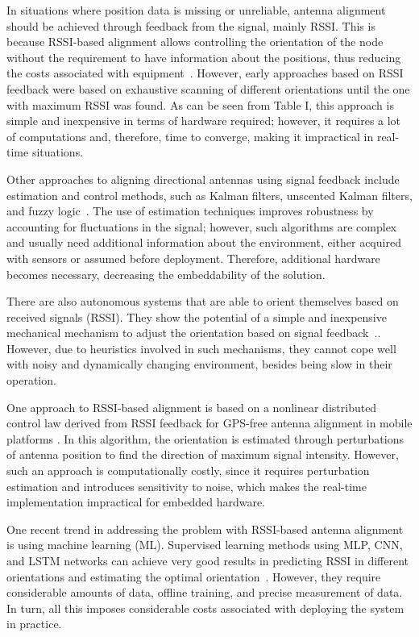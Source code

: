 In situations where position data is missing or unreliable, antenna alignment should be achieved through feedback from the signal, mainly RSSI. This is because RSSI-based alignment allows controlling the orientation of the node without the requirement to have information about the positions, thus reducing the costs associated with equipment~\cite{ref11,ref12}. However, early approaches based on RSSI feedback were based on exhaustive scanning of different orientations until the one with maximum RSSI was found. As can be seen from Table I, this approach is simple and inexpensive in terms of hardware required; however, it requires a lot of computations and, therefore, time to converge, making it impractical in real-time situations.

Other approaches to aligning directional antennas using signal feedback include estimation and control methods, such as Kalman filters, unscented Kalman filters, and fuzzy logic~\cite{ref13}. The use of estimation techniques improves robustness by accounting for fluctuations in the signal; however, such algorithms are complex and usually need additional information about the environment, either acquired with sensors or assumed before deployment. Therefore, additional hardware becomes necessary, decreasing the embeddability of the solution.

There are also autonomous systems that are able to orient themselves based on received signals (RSSI). They show the potential of a simple and inexpensive mechanical mechanism to adjust the orientation based on signal feedback~\cite{ref14}.. However, due to heuristics involved in such mechanisms, they cannot cope well with noisy and dynamically changing environment, besides being slow in their operation.

One approach to RSSI-based alignment is based on a nonlinear distributed control law derived from RSSI feedback for GPS-free antenna alignment in mobile platforms \cite{ref11}. In this algorithm, the orientation is estimated through perturbations of antenna position to find the direction of maximum signal intensity. However, such an approach is computationally costly, since it requires perturbation estimation and introduces sensitivity to noise, which makes the real-time implementation impractical for embedded hardware.

One recent trend in addressing the problem with RSSI-based antenna alignment is using machine learning (ML). Supervised learning methods using MLP, CNN, and LSTM networks can achieve very good results in predicting RSSI in different orientations and estimating the optimal orientation~\cite{ref15}. However, they require considerable amounts of data, offline training, and precise measurement of data. In turn, all this imposes considerable costs associated with deploying the system in practice.

